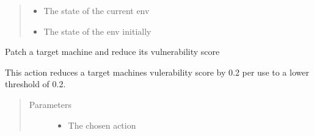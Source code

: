 \documentclass[letterpaper,10pt,english]{sphinxmanual}
\begin{document}
\begin{fulllineitems}
\begin{fulllineitems}
\begin{quote}
\begin{description}
\begin{itemize}
\item {}
\sphinxAtStartPar
{} \textendash{} The state of the current env

\item {}
\sphinxAtStartPar
{} \textendash{} The state of the env initially

\end{itemize}

\end{description}\end{quote}

\end{fulllineitems}


\begin{fulllineitems}
\label{\detokenize{source/yawning_titan.agents.static_agents:yawning_titan.agents.static_agents.simple_blue.SimpleBlue.nothing}}
\end{fulllineitems}


\begin{fulllineitems}
\label{\detokenize{source/yawning_titan.agents.static_agents:yawning_titan.agents.static_agents.simple_blue.SimpleBlue.patch_machines}}
\sphinxAtStartPar
Patch a target machine and reduce its vulnerability score

\sphinxAtStartPar
This action reduces a target machines vulerability score by 0.2
per use to a lower threshold of 0.2.
\begin{quote}\begin{description}
\item[{Parameters}] \leavevmode\begin{itemize}
\item {}
\sphinxAtStartPar
{} \textendash{} The chosen action


\end{itemize}
\end{description}
\end{quote}
\end{fulllineitems}
\end{fulllineitems}
\end{document}

